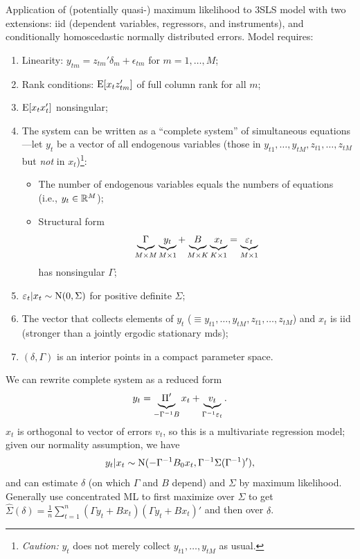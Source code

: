 \documentclass[8pt,letterpaper, landscape]{extarticle} %
\begin{document}
\begin{multicols}{3}
\begin{description}
 Application of (potentially quasi-) maximum likelihood to 3SLS model with two extensions: iid (dependent variables, regressors, and instruments), and conditionally homoscedastic normally distributed errors. Model requires:
\begin{enumerate}
\item Linearity: $ y_{tm} = z_{tm}' \delta_{m} + \epsilon_{tm} $ for $ m = 1 , \dotsc , M $;
\item Rank conditions: $ \E [x_t z_{tm}'] $ of full column rank for all $ m $;
\item $ \E [x_t x_{t}'] $ nonsingular;
\item The system can be written as a ``complete system'' of simultaneous equations---let $ y_t $ be a vector of all endogenous variables (those in $ y_{t1}, \dotsc, y_{tM}, z_{t1}, \dotsc, z_{tM} $ but \textit{not} in $ x_{t} $)\footnote{\textit{Caution:} $ y_t $ does not merely collect $ y_{t1}, \dotsc, y_{tM} $ as usual.}:
\begin{itemize}
\item The number of endogenous variables equals the numbers of equations (i.e., $ y_t \in \R^M $);
\item Structural form
\[ \underbrace{\Gamma \vphantom{y_t \Gamma B x_t \epsilon_t} }_{M \times M} \underbrace{y_t \vphantom{y_t \Gamma B x_t \epsilon_t} }_{M \times 1} + \underbrace{B \vphantom{y_t \Gamma B x_t \epsilon_t} }_{M \times K} \underbrace{x_t \vphantom{y_t \Gamma B x_t \epsilon_t} }_{K \times 1} = \underbrace{\epsilon_t \vphantom{y_t \Gamma B x_t \epsilon_t} }_{M \times 1} \]
has nonsingular $ \Gamma $;
\end{itemize}
\item $ \epsilon_t | x_t \sim \n (0, \Sigma) $ for positive definite $ \Sigma $;
\item The vector that collects elements of $ y_t $ ($ \equiv y_{t1}, \dotsc, y_{tM}, z_{t1}, \dotsc, z_{tM} $) and $ x_{t} $ is iid (stronger than a jointly ergodic stationary mds);
\item $ (\delta, \Gamma) $ is an interior points in a compact parameter space.
\end{enumerate}

We can rewrite complete system as a reduced form
\[ y_t = \underbrace{\Pi' \vphantom{v_t \Pi'} }_{- \Gamma^{-1}  B} x_t + \underbrace{v_t \vphantom{v_t \Pi'} }_{\Gamma^{-1} \epsilon_t} . \]
$ x_t $ is orthogonal to vector of errors $ v_t $, so this is a multivariate regression model; given our normality assumption, we have
\[ y_t | x_t \sim \n ( - \Gamma^{-1} B_0 x_t , \Gamma^{-1}  \Sigma (\Gamma^{-1})' ), \]
and can estimate $ \delta $ (on which $ \Gamma $ and $ B $ depend) and $ \Sigma $ by maximum likelihood. Generally use concentrated ML to first maximize over $ \Sigma $ to get
$ \widehat{\Sigma} (\delta) = \tfrac{1}{n} \sum_{t=1}^{n} (\Gamma y_t + Bx_t)(\Gamma y_t + Bx_t)' $
and then over $ \delta $.


\end{description}
\end{multicols}
\end{document}
